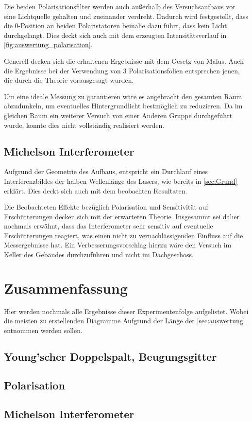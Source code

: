 \documentclass[12pt,english,ngerman]{scrartcl}
\begin{document}
Die beiden Polarisationsfilter werden auch außerhalb des Versuchsaufbaus vor
eine Lichtquelle gehalten und zueinander verdreht. Dadurch wird festgestellt,
dass die 0-Position an beiden Polaristatoren beinahe dazu führt, dass kein
Licht durchgelangt. Dies deckt sich auch mit dem erzeugten Intensitätsverlauf
in \autoref{fig:auswertung_polarisation}.

Generell decken sich die erhaltenen Ergebnisse mit dem Gesetz von Malus. Auch
die Ergebnisse bei der Verwendung von 3 Polarisationsfolien entsprechen jenen,
die durch die Theorie vorausgesagt wurden.

Um eine ideale Messung zu garantieren wäre es angebracht den gesamten Raum
abzudunkeln, um eventuelles Hintergrundlicht bestmöglich zu reduzieren. Da im
gleichen Raum ein weiterer Versuch von einer Anderen Gruppe durchgeführt wurde,
konnte dies nicht vollständig realisiert werden.

\subsection{Michelson Interferometer}

Aufgrund der Geometrie des Aufbaus, entspricht ein Durchlauf eines
Interferenzbildes der halben Wellenlänge des Lasers, wie bereits in
\autoref{sec:Grund} erklärt. Dies deckt sich auch mit dem beobachten
Resultaten.

Die Beobachteten Effekte bezüglich Polarisation und Sensitivität auf
Erschütterungen decken sich mit der erwarteten Theorie. Insgesammt sei daher
nochmals erwähnt, dass das Interferometer sehr sensitiv auf eventuelle
Erschütterungen reagiert, was einen nicht zu vernachlässigenden Einfluss auf
die Messergebnisse hat. Ein Verbesserungsvorschlag hierzu wäre den Versuch im
Keller des Gebäudes durchzuführen und nicht im Dachgeschoss.

\section{Zusammenfassung}\label{sec:zusammenfassung}

Hier werden nochmals alle Ergebnisse dieser Experimentenfolge aufgelistet.
Wobei die meisten zu erstellenden Diagramme Aufgrund der Länge der
\autoref{sec:auswertung} entnommen werden sollen.

\subsection{Young'scher Doppelspalt, Beugungsgitter}

\subsection{Polarisation}

\subsection{Michelson Interferometer}

\newpage
\printbibliography
\listoffigures
\listoftables
\end{document}
